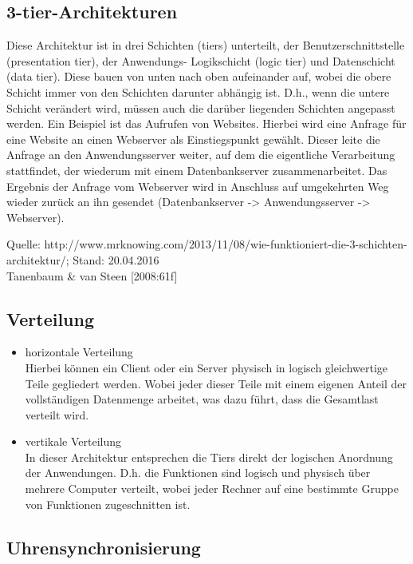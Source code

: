 \documentclass[a4paper]{scrartcl}
\begin{document}
\subsection{3-tier-Architekturen}
Diese Architektur ist in drei Schichten (tiers) unterteilt, der Benutzerschnittstelle (presentation tier), der Anwendungs- Logikschicht (logic tier) und Datenschicht (data tier). Diese bauen von unten nach oben aufeinander auf, wobei die obere Schicht immer von den Schichten darunter abhängig ist. D.h., wenn die untere Schicht verändert wird, müssen auch die darüber liegenden Schichten angepasst werden. Ein Beispiel ist das Aufrufen von Websites. Hierbei wird eine Anfrage für eine Website an einen Webserver als Einstiegspunkt gewählt. Dieser leite die Anfrage an den Anwendungsserver weiter, auf dem die eigentliche Verarbeitung stattfindet, der wiederum mit einem Datenbankserver zusammenarbeitet. Das Ergebnis der Anfrage vom Webserver wird in Anschluss auf umgekehrten Weg wieder zurück an ihn gesendet (Datenbankserver -> Anwendungsserver -> Webserver).

Quelle: http://www.mrknowing.com/2013/11/08/wie-funktioniert-die-3-schichten-architektur/; Stand: 20.04.2016 \\ Tanenbaum \& van Steen [2008:61f]

\subsection{Verteilung}
	\begin{itemize}
		\item horizontale Verteilung \\
		Hierbei können ein Client oder ein Server physisch in logisch gleichwertige Teile gegliedert werden. Wobei jeder dieser Teile mit einem eigenen Anteil der vollständigen Datenmenge arbeitet, was dazu führt, dass die Gesamtlast verteilt wird.

		\item vertikale Verteilung \\
		In dieser Architektur entsprechen die Tiers direkt der logischen Anordnung der Anwendungen. D.h. die Funktionen sind logisch und physisch über mehrere Computer verteilt, wobei jeder Rechner auf eine bestimmte Gruppe von Funktionen zugeschnitten ist.
	\end{itemize}

\subsection{Uhrensynchronisierung}
\end{document}
